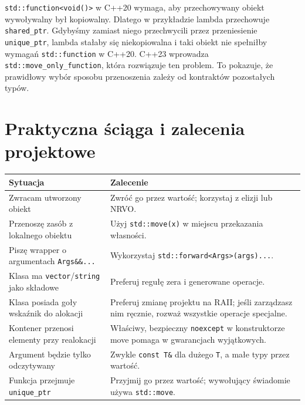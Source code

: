 \texttt{std::function<void()>} w C++20 wymaga, aby przechowywany
obiekt wywoływalny był kopiowalny. Dlatego w przykładzie lambda
przechowuje \texttt{shared\_ptr}. Gdybyśmy zamiast niego
przechwycili przez przeniesienie \texttt{unique\_ptr}, lambda
stałaby się niekopiowalna i taki obiekt nie spełniłby
wymagań \texttt{std::function} w C++20. C++23 wprowadza
\texttt{std::move\_only\_function}, która rozwiązuje ten problem.
To pokazuje, że prawidłowy wybór sposobu przenoszenia zależy
od kontraktów pozostałych typów.

\section{Praktyczna ściąga i zalecenia projektowe}

\begin{center}
\begin{tabular}{|p{4.0cm}|p{8.4cm}|}
\hline
\textbf{Sytuacja} & \textbf{Zalecenie} \\
\hline
Zwracam utworzony obiekt & Zwróć go przez wartość; korzystaj z elizji lub NRVO. \\
\hline
Przenoszę zasób z lokalnego obiektu & Użyj \texttt{std::move(x)} w miejscu przekazania własności. \\
\hline
Piszę wrapper o argumentach \texttt{Args\&\&...} & Wykorzystaj \texttt{std::forward<Args>(args)...}. \\
\hline
Klasa ma \texttt{vector}/\texttt{string} jako składowe & Preferuj regułę zera i generowane operacje. \\
\hline
Klasa posiada goły wskaźnik do alokacji & Preferuj zmianę projektu na RAII; jeśli zarządzasz nim ręcznie, rozważ wszystkie operacje specjalne. \\
\hline
Kontener przenosi elementy przy realokacji & Właściwy, bezpieczny \texttt{noexcept} w konstruktorze move pomaga w gwarancjach wyjątkowych. \\
\hline
Argument będzie tylko odczytywany & Zwykle \texttt{const T\&} dla dużego \texttt{T}, a małe typy przez wartość. \\
\hline
Funkcja przejmuje \texttt{unique\_ptr} & Przyjmij go przez wartość; wywołujący świadomie używa \texttt{std::move}. \\
\hline
\end{tabular}
\end{center}

